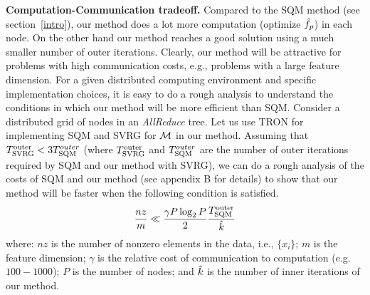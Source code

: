 {\bf Computation-Communication tradeoff.}
Compared to the SQM method (see section~\ref{intro}), our method does a lot more computation (optimize $\hat{f}_p$) in each node. On the other hand our method reaches a good solution using a much smaller number of outer iterations. Clearly, our method will be attractive for problems with high communication costs, e.g., problems with a large feature dimension. For a given distributed computing environment and specific implementation choices, it is easy to do a rough analysis to understand the conditions in which our method will be more efficient than SQM. Consider a distributed grid of nodes in an {\it AllReduce} tree. Let us use TRON for implementing SQM and SVRG for ${\cal M}$ in our method. Assuming that $T_{\rm SVRG}^{\rm outer}<3T_{\rm SQM}^{outer}$ (where $T_{\rm SVRG}^{\rm outer}$ and $T_{\rm SQM}^{outer}$ are the number of outer iterations required by SQM and our method with SVRG), we can do a rough analysis of the costs of SQM and our method (see appendix B for details) to show that our method will be faster when the following condition is satisfied.
\begin{equation}
\frac{nz}{m} \ll \frac{\gamma P \log_2 P}{2} \frac{T_{\rm SQM}^{\rm outer}}{\hat{k}}
\label{comm}
\end{equation}
where: $nz$ is the number of nonzero elements in the data, i.e., $\{x_i\}$; $m$ is the feature dimension; $\gamma$ is the relative cost of communication to computation (e.g. $100-1000$); $P$ is the number of nodes; and $\hat{k}$ is the number of inner iterations of our method.


